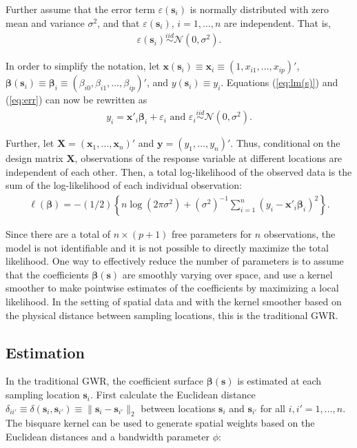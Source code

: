 \documentclass[authoryear, review, 11pt]{elsarticle}
\begin{document}
	Further assume that the error term $\varepsilon(\bm{s}_i)$ is normally distributed with zero mean and variance $\sigma^2$, and that $\varepsilon(\bm{s}_i)$, $i=1, \dots, n$ are independent. That is,
	\begin{align} \label{eq:err}
		\varepsilon(\bm{s}_i) \overset{iid}{\sim} \mathcal{N} \left( 0,\sigma^2 \right).
	\end{align}
	
	In order to simplify the notation, let $\bm{x}(\bm{s}_i) \equiv \bm{x}_i \equiv \left( 1, x_{i1}, \dots, x_{ip} \right)'$, $\bm{\beta}(\bm{s}_i) \equiv \bm{\beta}_i \equiv \left(\beta_{i0}, \beta_{i1}, \dots, \beta_{ip} \right)'$, and $y(\bm{s}_i) \equiv y_i$.  Equations (\ref{eq:lm(s)}) and (\ref{eq:err}) can now be rewritten as
	\begin{align}
		y_i = \bm{x}'_i \bm{\beta}_i + \varepsilon_i \text{ and } \varepsilon_i \overset{iid}{\sim} \mathcal{N} \left( 0,\sigma^2 \right).
	\end{align}
	
	Further, let $\bm{X} = \left( \bm{x}_1, \dots, \bm{x}_n \right)'$ and $\bm{y} = \left( y_1, \dots, y_n \right)'$. Thus, conditional on the design matrix $\bm{X}$, observations of the response variable at different locations are independent of each other. Then, a total log-likelihood of the observed data is the sum of the log-likelihood of each individual observation:
	 \begin{align}
	 	\ell\left( \bm{\beta} \right) = - \left(1/2\right) \left\{ n \log \left( 2 \pi \sigma^2\right) +  \left(\sigma^{2}\right)^{-1}  \sum_{i=1}^n \left(y_i - \bm{x}'_i\bm{\beta}_i \right)^2  \right\}.
	\end{align}
	
	Since there are a total of $n \times (p+1)$ free parameters for $n$ observations, the model is not identifiable and it is not possible to directly maximize the total likelihood. One way to effectively reduce the number of parameters is to assume that the coefficients $\bm{\beta}(\bm{s})$ are smoothly varying over space, and use a kernel smoother to make pointwise estimates of the coefficients by maximizing a local likelihood. In the setting of spatial data and with the kernel smoother based on the physical distance between sampling locations, this is the traditional GWR.
		
	\subsection{Estimation}		
	In the traditional GWR, the coefficient surface $\bm{\beta}(\bm{s})$ is estimated at each sampling location $\bm{s}_i$. First calculate the Euclidean distance $\delta_{ii'} \equiv \delta\left(\bm{s}_i, \bm{s}_{i'}\right) \equiv \|\bm{s}_i  -\bm{s}_{i'}\|_2$ between locations $\bm{s}_i$ and $\bm{s}_{i'}$ for all $i, i' = 1, \dots, n$. The bisquare kernel can be used to generate spatial weights based on the Euclidean distances and a bandwidth parameter $\phi$:
	
\end{document}
